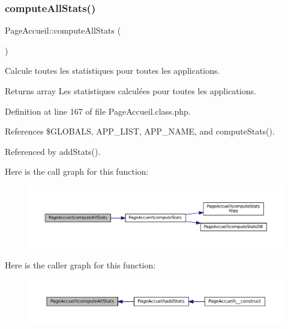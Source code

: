 \subsubsection{\texorpdfstring{compute\+All\+Stats()}{computeAllStats()}}
{\footnotesize\ttfamily Page\+Accueil\+::compute\+All\+Stats (\begin{DoxyParamCaption}{ }\end{DoxyParamCaption})\hspace{0.3cm}{\ttfamily [protected]}}

Calcule toutes les statistiques pour toutes les applications.

\begin{DoxyReturn}{Returns}
array Les statistiques calculées pour toutes les applications. 
\end{DoxyReturn}


Definition at line 167 of file Page\+Accueil.\+class.\+php.



References \$\+G\+L\+O\+B\+A\+LS, A\+P\+P\+\_\+\+L\+I\+ST, A\+P\+P\+\_\+\+N\+A\+ME, and compute\+Stats().



Referenced by add\+Stats().

Here is the call graph for this function\+:\nopagebreak
\begin{figure}[H]
\begin{center}
\leavevmode
\includegraphics[width=350pt]{class_page_accueil_a4acc4c64a5b79fd4d0f12ccbeeabe83e_cgraph}
\end{center}
\end{figure}
Here is the caller graph for this function\+:\nopagebreak
\begin{figure}[H]
\begin{center}
\leavevmode
\includegraphics[width=350pt]{class_page_accueil_a4acc4c64a5b79fd4d0f12ccbeeabe83e_icgraph}
\end{center}
\end{figure}
\mbox{\label{class_page_accueil_a98f6fc9d30fc6ce0e44230887a2f2958}} 
